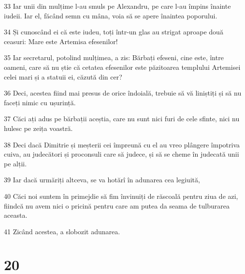 \par 33 Iar unii din mulțime l-au smuls pe Alexandru, pe care l-au împins înainte iudeii. Iar el, făcând semn cu mâna, voia să se apere înaintea poporului.
\par 34 Și cunoscând ei că este iudeu, toți într-un glas au strigat aproape două ceasuri: Mare este Artemisa efesenilor!
\par 35 Iar secretarul, potolind mulțimea, a zis: Bărbați efeseni, cine este, între oameni, care să nu știe că cetatea efesenilor este păzitoarea templului Artemisei celei mari și a statuii ei, căzută din cer?
\par 36 Deci, acestea fiind mai presus de orice îndoială, trebuie să vă liniștiți și să nu faceți nimic cu ușurință.
\par 37 Căci ați adus pe bărbații aceștia, care nu sunt nici furi de cele sfinte, nici nu hulesc pe zeița voastră.
\par 38 Deci dacă Dimitrie și meșterii cei împreună cu el au vreo plângere împotriva cuiva, au judecători și proconsuli care să judece, și să se cheme în judecată unii pe alții.
\par 39 Iar dacă urmăriți altceva, se va hotărî în adunarea cea legiuită,
\par 40 Căci noi suntem în primejdie să fim învinuiți de răscoală pentru ziua de azi, fiindcă nu avem nici o pricină pentru care am putea da seama de tulburarea aceasta.
\par 41 Zicând acestea, a slobozit adunarea.

\chapter{20}


